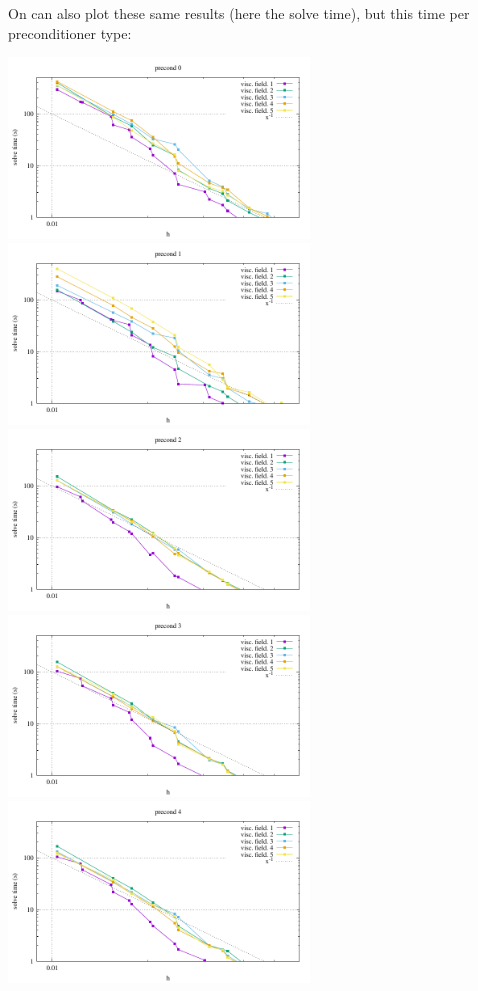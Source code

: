 \newpage
On can also plot these same results (here the solve time), 
but this time per preconditioner type:

\begin{center} 
\includegraphics[width=8cm]{python_codes/fieldstone_16/results/solve_time_ps0.pdf}
\includegraphics[width=8cm]{python_codes/fieldstone_16/results/solve_time_ps1.pdf}\\
\includegraphics[width=8cm]{python_codes/fieldstone_16/results/solve_time_ps2.pdf}
\includegraphics[width=8cm]{python_codes/fieldstone_16/results/solve_time_ps3.pdf}\\
\includegraphics[width=8cm]{python_codes/fieldstone_16/results/solve_time_ps4.pdf}
\end{center}








